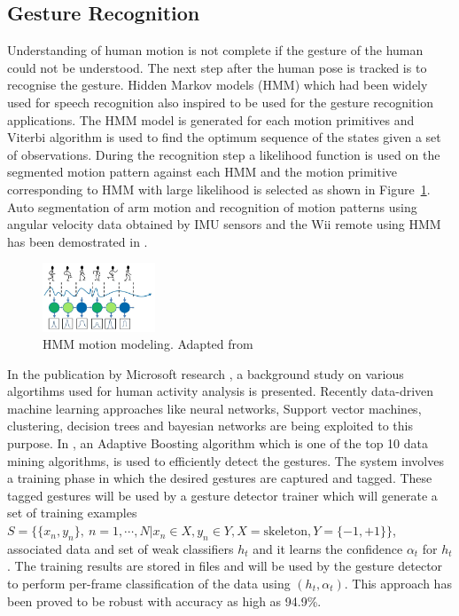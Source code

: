 \subsection{Gesture Recognition}
	Understanding of human motion is not complete if the gesture of the human could not be understood. The next step after the human pose is tracked is to recognise the gesture. Hidden Markov models (HMM) which had been widely used for speech recognition\cite{rabiner1989tutorial} also inspired to be used for the gesture recognition applications. The HMM model is generated for each motion primitives and Viterbi algorithm is used to find the optimum sequence of the states given a set of observations. During the recognition step a likelihood function is used on the segmented motion pattern against each HMM and the motion primitive corresponding to HMM with large likelihood is selected as shown in Figure~\ref{fig:hmm}. Auto segmentation of arm motion and recognition of motion patterns using angular velocity data obtained by IMU sensors and the Wii remote using HMM has been demostrated in \cite{aoki2013segmentation}. 
\begin{figure}[H]
\centering
\includegraphics[width=0.3\textwidth]{assets/HMM.png}
\caption[HMM motion modeling]{HMM motion modeling. {Adapted from \cite{aoki2013segmentation}}}
\label{fig:hmm}
\end{figure}
In the publication by Microsoft research \cite{han2013enhanced}, a background study on various algortihms used for human activity analysis is presented. Recently \cite{KinectSDK2014} data-driven machine learning approaches like neural networks, Support vector machines, clustering, decision trees and bayesian networks are being exploited to this purpose. In \cite{KinectSDK2014}, an Adaptive Boosting algorithm\cite{freund1997decision} which is one of the top 10 data mining algorithms, is used to efficiently detect the gestures. The system involves a training phase in which the desired gestures are captured and tagged. These tagged gestures will be used by a gesture detector trainer which will generate a set of training examples $S=\lbrace \lbrace x_n,y_n \rbrace,\ n=1,\cdots,N \vert x_n\in X,y_n\in Y, X=\text{skeleton},Y=\lbrace -1,+1 \rbrace\rbrace$, associated data and set of weak classifiers $h_t$ and it learns the confidence $\alpha_t$ for $h_t$. The training results are stored in files and will be used by the gesture detector to perform per-frame classification of the data using $(h_t,\alpha_t)$. This approach has been proved to be robust with accuracy as high as 94.9\%. 

